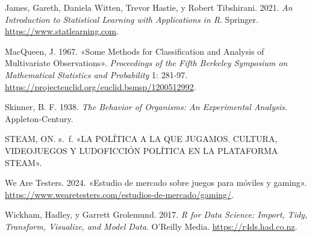 \documentclass[
  letterpaper,
  DIV=11,
  numbers=noendperiod]{scrreprt}
\newlength{\cslhangindent}
\newlength{\cslentryspacingunit} %
\newenvironment{CSLReferences}[2] %
 {%
  \setlength{\parindent}{0pt}
  \ifodd #1
  \let\oldpar\par
  \def\par{\hangindent=\cslhangindent\oldpar}
  \fi
  \setlength{\parskip}{#2\cslentryspacingunit}
 }%
 {}
\begin{document}
\begin{CSLReferences}{1}{0}
\leavevmode{}%
James, Gareth, Daniela Witten, Trevor Hastie, y Robert Tibshirani. 2021.
\emph{An Introduction to Statistical Learning with Applications in R}.
Springer. \url{https://www.statlearning.com}.

\leavevmode{}%
MacQueen, J. 1967. {«Some Methods for Classification and Analysis of
Multivariate Observations»}. \emph{Proceedings of the Fifth Berkeley
Symposium on Mathematical Statistics and Probability} 1: 281-97.
\url{https://projecteuclid.org/euclid.bsmsp/1200512992}.

\leavevmode{}%
Skinner, B. F. 1938. \emph{The Behavior of Organisms: An Experimental
Analysis}. Appleton-Century.

\leavevmode{}%
STEAM, ON. s.~f. {«LA POLÍTICA A LA QUE JUGAMOS. CULTURA, VIDEOJUEGOS Y
LUDOFICCIÓN POLÍTICA EN LA PLATAFORMA STEAM»}.

\leavevmode{}%
We Are Testers. 2024. {«Estudio de mercado sobre juegos para móviles y
gaming»}.
\url{https://www.wearetesters.com/estudios-de-mercado/gaming/}.

\leavevmode{}%
Wickham, Hadley, y Garrett Grolemund. 2017. \emph{R for Data Science:
Import, Tidy, Transform, Visualize, and Model Data}. O'Reilly Media.
\url{https://r4ds.had.co.nz}.

\end{CSLReferences}
\end{document}
